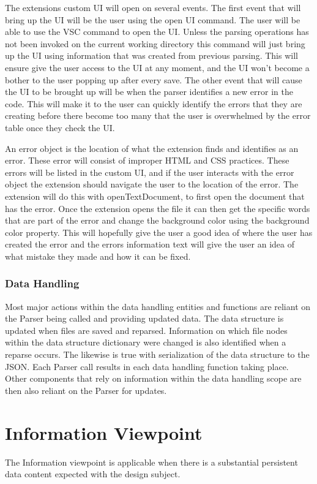 \documentclass[letterpaper,10pt,titlepage,draftclsnofoot,onecolumn,onesided] {IEEEtran}
\begin{document}
	The extensions custom UI will open on several events. 
	The first event that will bring up the UI will be the user using the open UI command. 
	The user will be able to use the VSC command to open the UI. 
	Unless the parsing operations has not been invoked on the current working directory this command will just bring up the UI using information that was created from previous parsing. 
	This will ensure give the user access to the UI at any moment, and the UI won't become a bother to the user popping up after every save. 
	The other event that will cause the UI to be brought up will be when the parser identifies a new error in the code.	
	This will make it to the user can quickly identify the errors that they are creating before there become too many that the user is overwhelmed by the error table once they check the UI.

	An error object is the location of what the extension finds and identifies as an error.
	These error will consist of improper HTML and CSS practices. 
	These errors will be listed in the custom UI, and if the user interacts with the error object the extension should navigate the user to the location of the error.
	The extension will do this with openTextDocument, to first open the document that has the error. 
	Once the extension opens the file it can then get the specific words that are part of the error and change the background color using the background color property. \cite{VSCodeDocumentation}
	This will hopefully give the user a good idea of where the user has created the error and the errors information text will give the user an idea of what mistake they made and how it can be fixed.

\subsubsection{Data Handling}
	Most major actions within the data handling entities and functions are reliant on the Parser being called and providing updated data.
	The data structure is updated when files are saved and reparsed. 
	Information on which file nodes within the data structure dictionary were changed is also identified when a reparse occurs.
	The likewise is true with serialization of the data structure to the JSON.
	Each Parser call results in each data handling function taking place. 
	Other components that rely on information within the data handling scope are then also reliant on the Parser for updates.
	

	
\section{Information Viewpoint}
The Information viewpoint is applicable when there is a substantial persistent data content expected with
the design subject. 
\end{document}
